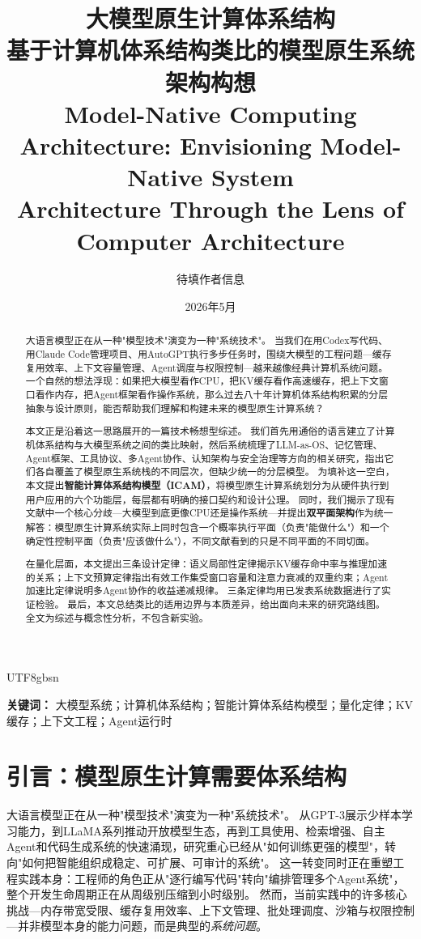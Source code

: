 \documentclass[11pt,a4paper]{article}
\title{\textbf{大模型原生计算体系结构}\\[6pt]
\large 基于计算机体系结构类比的模型原生系统架构构想\\[4pt]
\normalsize Model-Native Computing Architecture: Envisioning Model-Native System\\
Architecture Through the Lens of Computer Architecture}
\author{待填作者信息}
\date{2026年5月}
\begin{document}
\begin{CJK*}{UTF8}{gbsn}
\maketitle

\begin{abstract}
大语言模型正在从一种"模型技术"演变为一种"系统技术"。
当我们在用Codex写代码、用Claude Code管理项目、用AutoGPT执行多步任务时，围绕大模型的工程问题---缓存复用效率、上下文容量管理、Agent调度与权限控制---越来越像经典计算机系统问题。
一个自然的想法浮现：如果把大模型看作CPU，把KV缓存看作高速缓存，把上下文窗口看作内存，把Agent框架看作操作系统，那么过去八十年计算机体系结构积累的分层抽象与设计原则，能否帮助我们理解和构建未来的模型原生计算系统？

本文正是沿着这一思路展开的一篇技术畅想型综述。
我们首先用通俗的语言建立了计算机体系结构与大模型系统之间的类比映射，然后系统梳理了LLM-as-OS、记忆管理、Agent框架、工具协议、多Agent协作、认知架构与安全治理等方向的相关研究，指出它们各自覆盖了模型原生系统栈的不同层次，但缺少统一的分层模型。
为填补这一空白，本文提出\textbf{智能计算体系结构模型（ICAM）}，将模型原生计算系统划分为从硬件执行到用户应用的六个功能层，每层都有明确的接口契约和设计公理。
同时，我们揭示了现有文献中一个核心分歧---大模型到底更像CPU还是操作系统---并提出\textbf{双平面架构}作为统一解答：模型原生计算系统实际上同时包含一个概率执行平面（负责"能做什么"）和一个确定性控制平面（负责"应该做什么"），不同文献看到的只是不同平面的不同切面。

在量化层面，本文提出三条设计定律：语义局部性定律揭示KV缓存命中率与推理加速的关系；上下文预算定律指出有效工作集受窗口容量和注意力衰减的双重约束；Agent加速比定律说明多Agent协作的收益递减规律。
三条定律均用已发表系统数据进行了实证检验。
最后，本文总结类比的适用边界与本质差异，给出面向未来的研究路线图。
全文为综述与概念性分析，不包含新实验。
\end{abstract}

\textbf{关键词：} 大模型系统；计算机体系结构；智能计算体系结构模型；量化定律；KV缓存；上下文工程；Agent运行时

\section{引言：模型原生计算需要体系结构}
\label{sec:intro}

大语言模型正在从一种"模型技术"演变为一种"系统技术"。
从GPT-3展示少样本学习能力\cite{brown2020gpt3}，到LLaMA系列推动开放模型生态\cite{llama2023}，再到工具使用\cite{schick2023toolformer}、检索增强\cite{lewis2020rag}、自主Agent\cite{yao2023react}和代码生成系统\cite{openhands_paper_2025,sweagent2024}的快速涌现，研究重心已经从"如何训练更强的模型"，转向"如何把智能组织成稳定、可扩展、可审计的系统"。
这一转变同时正在重塑工程实践本身：工程师的角色正从"逐行编写代码"转向"编排管理多个Agent系统"，整个开发生命周期正在从周级别压缩到小时级别\cite{anthropic2026agenticreport}。
然而，当前实践中的许多核心挑战---内存带宽受限\cite{gholami2024memorywall}、缓存复用效率\cite{kwon2023pagedattention}、上下文管理\cite{memgpt2023}、批处理调度\cite{orca2022}、沙箱与权限控制\cite{ironclaw2025}---并非模型本身的能力问题，而是典型的\emph{系统问题}。


\end{CJK*}
\end{document}
